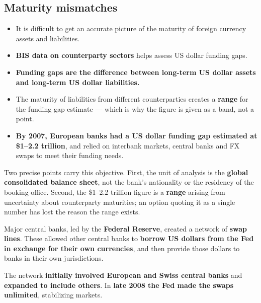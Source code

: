 \subsection{Maturity mismatches}

\begin{itemize}
\item It is difficult to get an accurate picture of the maturity of foreign currency assets and liabilities.
\item \textbf{BIS data on counterparty sectors} helps assess US dollar funding gaps.
\item \textbf{Funding gaps are the difference between long-term US dollar assets and long-term US dollar liabilities.}
\item The maturity of liabilities from different counterparties creates a \textbf{range} for the funding gap estimate --- which is why the figure is given as a band, not a point.
\item \textbf{By 2007, European banks had a US dollar funding gap estimated at \$1--2.2 trillion}, and relied on interbank markets, central banks and FX swaps to meet their funding needs.
\end{itemize}

\begin{lrtrapbox}
Two precise points carry this objective. First, the unit of analysis is the \textbf{global consolidated balance sheet}, not the bank's nationality or the residency of the booking office. Second, the \$1--2.2 trillion figure is a \textbf{range} arising from uncertainty about counterparty maturities; an option quoting it as a single number has lost the reason the range exists.
\end{lrtrapbox}


\begin{lrkeybox}
Major central banks, led by the \textbf{Federal Reserve}, created a network of \textbf{swap lines}. These allowed other central banks to \textbf{borrow US dollars from the Fed in exchange for their own currencies}, and then provide those dollars to banks in their own jurisdictions.

The network \textbf{initially involved European and Swiss central banks} and \textbf{expanded to include others}. In \textbf{late 2008 the Fed made the swaps unlimited}, stabilizing markets.
\end{lrkeybox}

